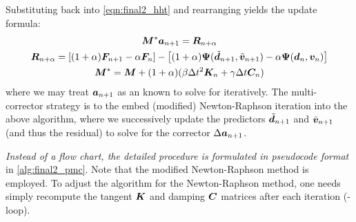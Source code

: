 Substituting back into \cref{eqn:final2_hht} and rearranging yields the update formula:
\begin{equation}
\begin{gathered}
    \bm{M}^* \bm{a}_{n+1} = \bm{R}_{n+\alpha} \\
    \bm{R}_{n+\alpha} = \left[(1+\alpha)\bm{F}_{n+1} - \alpha\bm{F}_n\right] - \left[(1+\alpha)\bm{\Psi}(\tilde{\bm{d}}_{n+1}, \tilde{\bm{v}}_{n+1}) - \alpha\bm{\Psi}(\bm{d}_n, \bm{v}_n) \right] \\
    \bm{M}^* = \bm{M} + (1+\alpha)(\beta \Delta t^2 \bm{K}_n + \gamma \Delta t \bm{C}_n)
\end{gathered}
\end{equation}
where we may treat $\bm{a}_{n+1}$ as an known to solve for iteratively.
The multi-corrector strategy is to the embed (modified) Newton-Raphson iteration into the above algorithm, where we successively update the predictors $\tilde{\bm{d}}_{n+1}$ and $\tilde{\bm{v}}_{n+1}$ (and thus the residual) to solve for the corrector $\Delta \bm{a}_{n+1}$.

\emph{Instead of a flow chart, the detailed procedure is formulated in pseudocode format} in \cref{alg:final2_pmc}. 
Note that the modified Newton-Raphson method is employed. 
To adjust the algorithm for the Newton-Raphson method, one needs simply recompute the tangent $\bm{K}$ and damping $\bm{C}$ matrices after each iteration (-loop).  

